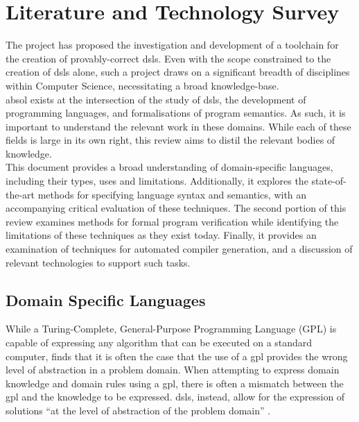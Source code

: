 \chapter{Literature and Technology Survey} %
\label{cha:literature_and_technology_survey}
The project has proposed the investigation and development of a toolchain for the creation of provably-correct \glspl{dsl}.
Even with the scope constrained to the creation of \glspl{dsl} alone, such a project draws on a significant breadth of disciplines within Computer Science, necessitating a broad knowledge-base. \\

\gls{absol} exists at the intersection of the study of \glspl{dsl}, the development of programming languages, and formalisations of program semantics. 
As such, it is important to understand the relevant work in these domains. 
While each of these fields is large in its own right, this review aims to distil the relevant bodies of knowledge. \\

This document provides a broad understanding of domain-specific languages, including their types, uses and limitations.
Additionally, it explores the state-of-the-art methods for specifying language syntax and semantics, with an accompanying critical evaluation of these techniques.
The second portion of this review examines methods for formal program verification while identifying the limitations of these techniques as they exist today. 
Finally, it provides an examination of techniques for automated compiler generation, and a discussion of relevant technologies to support such tasks. 

\section{Domain Specific Languages} %
\label{sec:domain_specific_languages}

While a Turing-Complete, General-Purpose Programming Language (GPL) is capable of expressing any algorithm that can be executed on a standard computer, \citet{fowler2010domain} finds that it is often the case that the use of a \gls{gpl} provides the wrong level of abstraction in a problem domain.
When attempting to express domain knowledge and domain rules using a \gls{gpl}, there is often a mismatch between the \gls{gpl} and the knowledge to be expressed. 
\glspl{dsl}, instead, allow for the expression of solutions ``at the level of abstraction of the problem domain'' \citep{van2000domain}.\\


